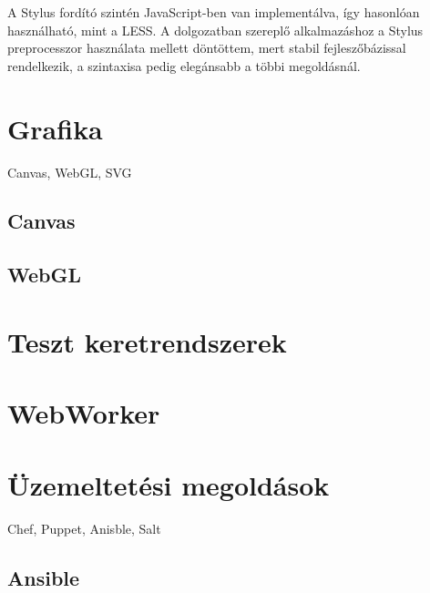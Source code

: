 A Stylus fordító szintén JavaScript-ben van implementálva, így hasonlóan
használható, mint a LESS.  A dolgozatban szereplő alkalmazáshoz a Stylus
preprocesszor használata mellett döntöttem, mert stabil fejleszőbázissal
rendelkezik, a szintaxisa pedig elegánsabb a többi megoldásnál.


\section{Grafika}

Canvas, WebGL, SVG

\subsection{Canvas}

\subsection{WebGL}

\section{Teszt keretrendszerek}

\section{WebWorker}

\section{Üzemeltetési megoldások}

Chef, Puppet, Anisble, Salt

\subsection{Ansible}
